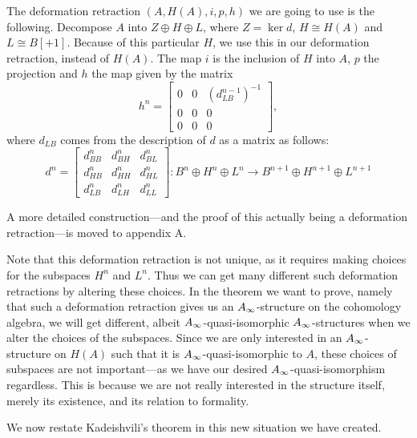 The deformation retraction $(A, H(A), i, p, h)$ we are going to use is the following. Decompose $A$ into $Z\oplus H\oplus L$, where $Z=\ker d$, $H\cong H(A)$ and $L\cong B[+1]$. Because of this particular $H$, we use this in our deformation retraction, instead of $H(A)$. The map $i$ is the inclusion of $H$ into $A$, $p$ the projection and $h$ the map given by the matrix 
\begin{equation*}
h^n = 
\begin{bmatrix}
0 & 0 & (d_{LB}^{n-1})^{-1}\\
0 & 0 & 0\\
0 & 0 & 0
\end{bmatrix}, 
\end{equation*}
where $d_{LB}$ comes from the description of $d$ as a matrix as follows:
\begin{equation*}
d^n = 
\begin{bmatrix}
    d^n_{BB} & d^n_{BH} & d^n_{BL} \\
    d^n_{HB} & d^n_{HH} & d^n_{HL} \\
    d^n_{LB} & d^n_{LH} & d^n_{LL} 
\end{bmatrix}
\colon B^n\oplus H^n\oplus L^n \longrightarrow B^{n+1}\oplus H^{n+1}\oplus L^{n+1}
\end{equation*}

A more detailed construction---and the proof of this actually being a deformation retraction---is moved to appendix A. 

Note that this deformation retraction is not unique, as it requires making choices for the subspaces $H^n$ and $L^n$. Thus we can get many different such deformation retractions by altering these choices. In the theorem we want to prove, namely that such a deformation retraction gives us an $A_{\infty}$-structure on the cohomology algebra, we will get different, albeit $A_{\infty}$-quasi-isomorphic $A_{\infty}$-structures when we alter the choices of the subspaces. Since we are only interested in an $A_{\infty}$-structure on $H(A)$ such that it is $A_{\infty}$-quasi-isomorphic to $A$, these choices of subspaces are not important---as we have our desired $A_{\infty}$-quasi-isomorphism regardless. This is because we are not really interested in the structure itself, merely its existence, and its relation to formality. 

We now restate Kadeishvili's theorem in this new situation we have created.

